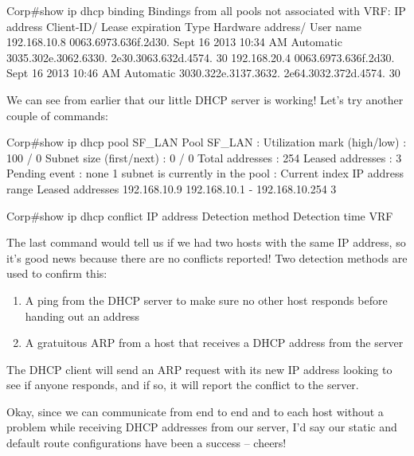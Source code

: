 \begin{cli}
Corp#show ip dhcp binding
Bindings from all pools not associated with VRF:
IP address          Client-ID/              Lease expiration        Type
                    Hardware address/
                    User name
192.168.10.8        0063.6973.636f.2d30.    Sept 16 2013 10:34 AM    Automatic
                    3035.302e.3062.6330.
                    2e30.3063.632d.4574.
                    30
192.168.20.4        0063.6973.636f.2d30.    Sept 16 2013 10:46 AM    Automatic
                    3030.322e.3137.3632.
                    2e64.3032.372d.4574.
                    30
\end{cli}

We can see from earlier that our little DHCP server is working!
Let's try another couple of commands:

\begin{cli}
Corp#show ip dhcp pool SF_LAN
Pool SF_LAN :
 Utilization mark (high/low)    : 100 / 0
 Subnet size (first/next)       : 0 / 0
 Total addresses                : 254
 Leased addresses               : 3
 Pending event                  : none
 1 subnet is currently in the pool :
 Current index        IP address range                    Leased addresses
 192.168.10.9         192.168.10.1     - 192.168.10.254    3
 
Corp#show ip dhcp conflict
IP address        Detection method   Detection time          VRF
\end{cli}

The last command would tell us if we had two hosts with the same IP
address, so it's good news because there are no conflicts reported! Two
detection methods are used to confirm this:

\begin{enumerate}
\item
  A ping from the DHCP server to make sure no other host responds before
  handing out an address
\item
  A gratuitous ARP from a host that receives a DHCP address from the
  server
\end{enumerate}

The DHCP client will send an ARP request with its new IP address looking
to see if anyone responds, and if so, it will report the conflict to the
server.

Okay, since we can communicate from end to end and to each host without
a problem while receiving DHCP addresses from our server, I'd say our
static and default route configurations have been a success -- cheers!



